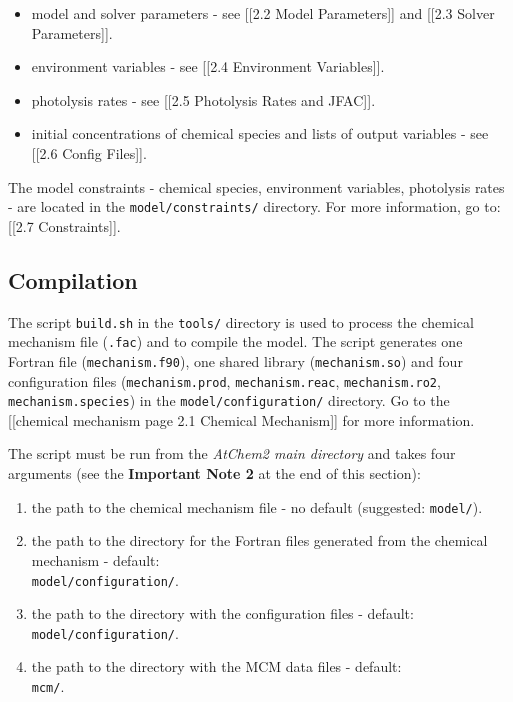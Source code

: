 \begin{itemize}
\item model and solver parameters - see {[}{[}2.2 Model
Parameters{]}{]} and {[}{[}2.3 Solver Parameters{]}{]}.
\item environment variables - see {[}{[}2.4 Environment
Variables{]}{]}.
\item photolysis rates - see {[}{[}2.5 Photolysis Rates and
JFAC{]}{]}.
\item initial concentrations of chemical species and lists of output
variables - see {[}{[}2.6 Config Files{]}{]}.
\end{itemize}

The model constraints - chemical species, environment variables,
photolysis rates - are located in the \texttt{model/constraints/}
directory. For more information, go to: {[}{[}2.7 Constraints{]}{]}.

\subsection{Compilation} \label{subsec:compilation}

The script \texttt{build.sh} in the \texttt{tools/} directory is used
to process the chemical mechanism file (\texttt{.fac}) and to compile
the model. The script generates one Fortran file
(\texttt{mechanism.f90}), one shared library (\texttt{mechanism.so})
and four configuration files (\texttt{mechanism.prod},
\texttt{mechanism.reac}, \texttt{mechanism.ro2},
\texttt{mechanism.species}) in the \texttt{model/configuration/}
directory. Go to the {[}{[}chemical mechanism page \textbar{}2.1
Chemical Mechanism{]}{]} for more information.

The script must be run from the \emph{AtChem2 main directory} and
takes four arguments (see the \textbf{Important Note 2} at the end of
this section):

\begin{enumerate}
\item the path to the chemical mechanism file - no default (suggested:
  \texttt{model/}).
\item the path to the directory for the Fortran files generated from
  the chemical mechanism - default:\\ \texttt{model/configuration/}.
\item the path to the directory with the configuration files -
  default:\\ \texttt{model/configuration/}.
\item the path to the directory with the MCM data files - default:\\
  \texttt{mcm/}.
\end{enumerate}

